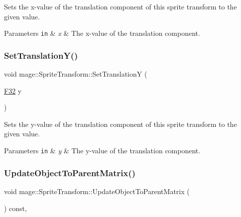 Sets the x-\/value of the translation component of this sprite transform to the given value.


\begin{DoxyParams}[1]{Parameters}
\mbox{\tt in}  & {\em x} & The x-\/value of the translation component. \\
\hline
\end{DoxyParams}
\hypertarget{structmage_1_1_sprite_transform_a3086df30d1ed6813db07bc78ef47df6c}{}\label{structmage_1_1_sprite_transform_a3086df30d1ed6813db07bc78ef47df6c} 
\subsubsection{\texorpdfstring{Set\+Translation\+Y()}{SetTranslationY()}}
{\footnotesize\ttfamily void mage\+::\+Sprite\+Transform\+::\+Set\+TranslationY (\begin{DoxyParamCaption}\item[{\hyperlink{namespacemage_aa97e833b45f06d60a0a9c4fc22ae02c0}{F32}}]{y }\end{DoxyParamCaption})\hspace{0.3cm}{\ttfamily [noexcept]}}

Sets the y-\/value of the translation component of this sprite transform to the given value.


\begin{DoxyParams}[1]{Parameters}
\mbox{\tt in}  & {\em y} & The y-\/value of the translation component. \\
\hline
\end{DoxyParams}
\hypertarget{structmage_1_1_sprite_transform_a92ae51f7dbf034d119625f70aa7fad1c}{}\label{structmage_1_1_sprite_transform_a92ae51f7dbf034d119625f70aa7fad1c} 
\subsubsection{\texorpdfstring{Update\+Object\+To\+Parent\+Matrix()}{UpdateObjectToParentMatrix()}}
{\footnotesize\ttfamily void mage\+::\+Sprite\+Transform\+::\+Update\+Object\+To\+Parent\+Matrix (\begin{DoxyParamCaption}{ }\end{DoxyParamCaption}) const\hspace{0.3cm}{\ttfamily [private]}, {\ttfamily [noexcept]}}

